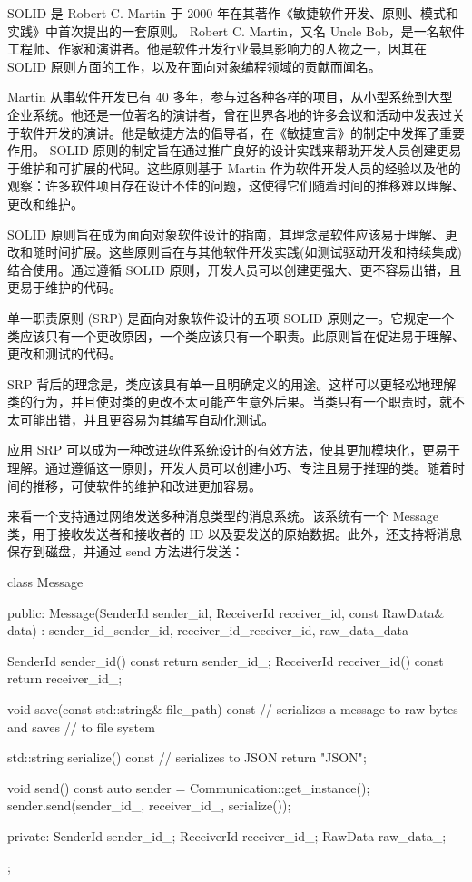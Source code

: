 
SOLID 是 Robert C. Martin 于 2000 年在其著作《敏捷软件开发、原则、模式和实践》中首次提出的一套原则。 Robert C. Martin，又名 Uncle Bob，是一名软件工程师、作家和演讲者。他是软件开发行业最具影响力的人物之一，因其在 SOLID 原则方面的工作，以及在面向对象编程领域的贡献而闻名。

Martin 从事软件开发已有 40 多年，参与过各种各样的项目，从小型系统到大型企业系统。他还是一位著名的演讲者，曾在世界各地的许多会议和活动中发表过关于软件开发的演讲。他是敏捷方法的倡导者，在《敏捷宣言》的制定中发挥了重要作用。 SOLID 原则的制定旨在通过推广良好的设计实践来帮助开发人员创建更易于维护和可扩展的代码。这些原则基于 Martin 作为软件开发人员的经验以及他的观察：许多软件项目存在设计不佳的问题，这使得它们随着时间的推移难以理解、更改和维护。

SOLID 原则旨在成为面向对象软件设计的指南，其理念是软件应该易于理解、更改和随时间扩展。这些原则旨在与其他软件开发实践(如测试驱动开发和持续集成)结合使用。通过遵循 SOLID 原则，开发人员可以创建更强大、更不容易出错，且更易于维护的代码。


单一职责原则 (SRP) 是面向对象软件设计的五项 SOLID 原则之一。它规定一个类应该只有一个更改原因，一个类应该只有一个职责。此原则旨在促进易于理解、更改和测试的代码。

SRP 背后的理念是，类应该具有单一且明确定义的用途。这样可以更轻松地理解类的行为，并且使对类的更改不太可能产生意外后果。当类只有一个职责时，就不太可能出错，并且更容易为其编写自动化测试。

应用 SRP 可以成为一种改进软件系统设计的有效方法，使其更加模块化，更易于理解。通过遵循这一原则，开发人员可以创建小巧、专注且易于推理的类。随着时间的推移，可使软件的维护和改进更加容易。

来看一个支持通过网络发送多种消息类型的消息系统。该系统有一个 Message 类，用于接收发送者和接收者的 ID 以及要发送的原始数据。此外，还支持将消息保存到磁盘，并通过 send 方法进行发送：

\begin{cpp}
class Message {
public:
    Message(SenderId sender_id, ReceiverId receiver_id,
            const RawData& data)
        : sender_id_{sender_id},
          receiver_id_{receiver_id}, raw_data_{data} {}

    SenderId sender_id() const { return sender_id_; }
    ReceiverId receiver_id() const { return receiver_id_; }

    void save(const std::string& file_path) const {
        // serializes a message to raw bytes and saves
        // to file system
    }

    std::string serialize() const {
        // serializes to JSON
        return {"JSON"};
    }

    void send() const {
        auto sender = Communication::get_instance();
        sender.send(sender_id_, receiver_id_, serialize());
    }

private:
    SenderId sender_id_;
    ReceiverId receiver_id_;
    RawData raw_data_;
};
\end{cpp}

